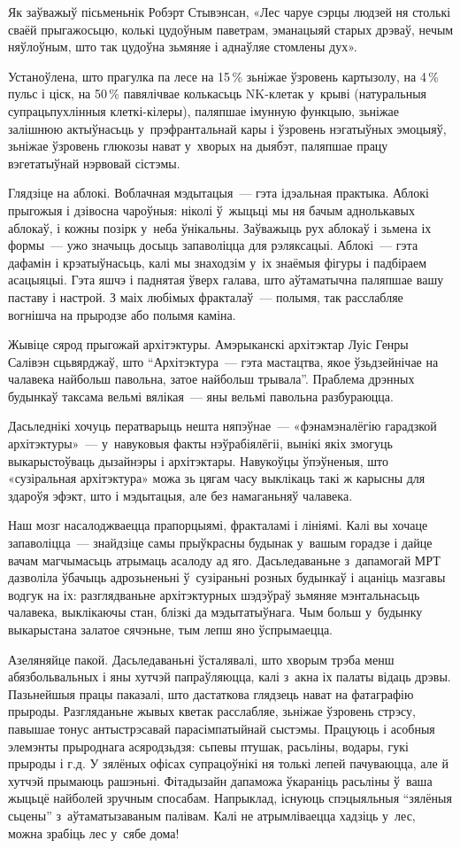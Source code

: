 Як заўважыў пісьменьнік Робэрт Стывэнсан, «Лес чаруе сэрцы людзей ня столькі сваёй прыгажосьцю, колькі цудоўным паветрам, эманацыяй старых дрэваў, нечым няўлоўным, што так цудоўна зьмяняе і аднаўляе стомлены дух».

Устаноўлена, што прагулка па лесе на 15\,\% зьніжае ўзровень картызолу, на 4\,\% пульс і ціск, на 50\,\% павялічвае колькасьць NK-клетак у~крыві (натуральныя супрацьпухлінныя клеткі-кілеры), паляпшае імунную функцыю, зьніжае залішнюю актыўнасьць у~прэфрантальнай кары і ўзровень нэгатыўных эмоцыяў, зьніжае ўзровень глюкозы нават у~хворых на дыябэт, паляпшае працу вэгетатыўнай нэрвовай сістэмы.

Глядзіце на аблокі. Воблачная мэдытацыя~--- гэта ідэальная практыка. Аблокі прыгожыя і дзівосна чароўныя: ніколі ў~жыцьці мы ня бачым аднолькавых аблокаў, і кожны позірк у~неба ўнікальны. Заўважыць рух аблокаў і зьмена іх формы~--- ужо значыць досыць запаволіцца для рэляксацыі. Аблокі~--- гэта дафамін і крэатыўнасьць, калі мы знаходзім у~іх знаёмыя фігуры і падбіраем асацыяцыі. Гэта яшчэ і паднятая ўверх галава, што аўтаматычна паляпшае вашу паставу і настрой. З маіх любімых фракталаў~--- полымя, так расслабляе вогнішча на прыродзе або полымя каміна.

Жывіце сярод прыгожай архітэктуры. Амэрыканскі архітэктар Луіс Генры Салівэн сцьвярджаў, што ``Архітэктура~--- гэта мастацтва, якое ўзьдзейнічае на чалавека найбольш павольна, затое найбольш трывала''. Праблема дрэнных будынкаў таксама вельмі вялікая~--- яны вельмі павольна разбураюцца. 

Дасьледнікі хочуць ператварыць нешта няпэўнае~--- «фэнамэналёгію гарадзкой архітэктуры»~--- у~навуковыя факты нэўрабіялёгіі, вынікі якіх змогуць выкарыстоўваць дызайнэры і архітэктары. Навукоўцы ўпэўненыя, што «сузіральная архітэктура» можа зь цягам часу выклікаць такі ж карысны для здароўя эфэкт, што і мэдытацыя, але без намаганьняў чалавека.

Наш мозг насалоджваецца прапорцыямі, фракталамі і лініямі. Калі вы хочаце запаволіцца~--- знайдзіце самы прыўкрасны будынак у~вашым горадзе і дайце вачам магчымасьць атрымаць асалоду ад яго. Дасьледаваньне з~дапамогай МРТ дазволіла ўбачыць адрозьненьні ў~сузіраньні розных будынкаў і ацаніць мазгавы водгук на іх: разглядваньне архітэктурных шэдэўраў зьмяняе мэнтальнасьць чалавека, выклікаючы стан, блізкі да мэдытатыўнага. Чым больш у~будынку выкарыстана залатое сячэньне, тым лепш яно ўспрымаецца.

Азеляняйце пакой. Дасьледаваньні ўсталявалі, што хворым трэба менш абязбольвальных і яны хутчэй папраўляюцца, калі з~акна іх палаты відаць дрэвы. Пазьнейшыя працы паказалі, што дастаткова глядзець нават на фатаграфію прыроды. Разгляданьне жывых кветак расслабляе, зьніжае ўзровень стрэсу, павышае тонус антыстрэсавай парасімпатыйнай сыстэмы. Працуюць і асобныя элемэнты прыроднага асяродзьдзя: сьпевы птушак, расьліны, водары, гукі прыроды і г.д. У зялёных офісах супрацоўнікі ня толькі лепей пачуваюцца, але й хутчэй прымаюць рашэньні. Фітадызайн дапаможа ўкараніць расьліны ў~ваша жыцьцё найболей зручным спосабам. Напрыклад, існуюць спэцыяльныя ``зялёныя сьцены'' з~аўтаматызаваным палівам. Калі не атрымліваецца хадзіць у~лес, можна зрабіць лес у~сябе дома!

